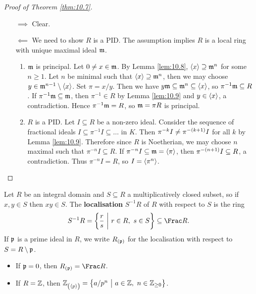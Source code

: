 \begin{proof}[Proof of Theorem \ref{thm:10.7}]
\hfill
\begin{itemize}
\item[$ \implies $] Clear.
\item[$ \impliedby $] We need to show $ R $ is a PID. The assumption implies $ R $ is a local ring with unique maximal ideal $ \mathfrak{m} $.
\begin{enumerate}[leftmargin=0.5in, label=Step \arabic*.]
\item $ \mathfrak{m} $ is principal. Let $ 0 \ne x \in \mathfrak{m} $. By Lemma \ref{lem:10.8}, $ \left\langle x \right\rangle \supseteq \mathfrak{m}^n $ for some $ n \ge 1 $. Let $ n $ be minimal such that $ \left\langle x \right\rangle \supseteq \mathfrak{m}^n $, then we may choose $ y \in \mathfrak{m}^{n - 1} \setminus \left\langle x \right\rangle $. Set $ \pi = x / y $. Then we have $ y\mathfrak{m} \subseteq \mathfrak{m}^n \subseteq \left\langle x \right\rangle $, so $ \pi^{-1}\mathfrak{m} \subseteq R $. If $ \pi^{-1}\mathfrak{m} \subseteq \mathfrak{m} $, then $ \pi^{-1} \in R $ by Lemma \ref{lem:10.9} and $ y \in \left\langle x \right\rangle $, a contradiction. Hence $ \pi^{-1}\mathfrak{m} = R $, so $ \mathfrak{m} = \pi R $ is principal.
\item $ R $ is a PID. Let $ I \subseteq R $ be a non-zero ideal. Consider the sequence of fractional ideals $ I \subseteq \pi^{-1}I \subseteq \dots $ in $ K $. Then $ \pi^{-k}I \ne \pi^{-\br{k + 1}}I $ for all $ k $ by Lemma \ref{lem:10.9}. Therefore since $ R $ is Noetherian, we may choose $ n $ maximal such that $ \pi^{-n}I \subseteq R $. If $ \pi^{-n}I \subseteq \mathfrak{m} = \left\langle \pi \right\rangle $, then $ \pi^{-\br{n + 1}}I \subseteq R $, a contradiction. Thus $ \pi^{-n}I = R $, so $ I = \left\langle \pi^n \right\rangle $.
\end{enumerate}
\end{itemize}
\end{proof}


Let $ R $ be an integral domain and $ S \subseteq R $ a multiplicatively closed subset, so if $ x, y \in S $ then $ xy \in S $. The \textbf{localisation} $ S^{-1}R $ of $ R $ with respect to $ S $ is the ring
$$ S^{-1}R = \cbr{\dfrac{r}{s} \st r \in R, \ s \in S} \subseteq \Frac R. $$
If $ \mathfrak{p} $ is a prime ideal in $ R $, we write $ R_{\br{\ppp}} $ for the localisation with respect to $ S = R \setminus \mathfrak{p} $.

\pagebreak

\begin{example*}
\hfill
\begin{itemize}
\item If $ \mathfrak{p} = 0 $, then $ R_{\br{\ppp}} = \Frac R $.
\item If $ R = \mathbb{Z} $, then $ \ZZ_{\br{\abr{p}}} = \cbr{a / p^n \st a \in \ZZ, \ n \in \ZZ_{\ge 0}} $.
\end{itemize}
\end{example*}

